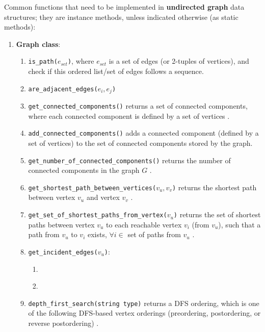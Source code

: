 Common functions that need to be implemented in {\bf undirected graph} data structures; they are instance methods, unless indicated otherwise (as static methods):
\begin{enumerate}
\item {\bf Graph class}: \vspace{-0.3cm}
	\begin{enumerate} \itemsep -2pt
	\item {\tt is\_path($e_{set}$)}, where $e_{set}$ is a set of edges (or 2-tuples of vertices), and check if this ordered list/set of edges follows a sequence.
	\item {\tt are\_adjacent\_edges($e_{i}, e_{j}$)} \cite[\S13.1.1, pp. 599]{Goodrich2011}
	\item {\tt get\_connected\_components()} returns a set of connected components, where each connected component is defined by a set of vertices \cite[\S52.44, pp. 850]{Goldman2008}.
	\item {\tt add\_connected\_components()} adds a connected component (defined by a set of vertices) to the set of connected components stored by the graph. %
	\item {\tt get\_number\_of\_connected\_components()} returns the number of connected components in the graph $G$ \cite[\S52.4, pp. 850]{Goldman2008}.
	\item {\tt get\_shortest\_path\_between\_vertices($v_{u}, v_{v}$)} returns the shortest path between vertex $v_{u}$ and vertex $v_{v}$ \cite[\S52.4, pp. 850]{Goldman2008}.
	\item {\tt get\_set\_of\_shortest\_paths\_from\_vertex($v_{u}$)} returns the set of shortest paths between vertex $v_{u}$ to each reachable vertex $v_{i}$ (from $v_{u}$), such that a path from $v_{u}$ to $v_{i}$ exists, $\forall i \in$ set of paths from $v_{u}$ \cite[\S52.4, pp. 850]{Goldman2008}.
	\item {\tt get\_incident\_edges($v_{u}$)}: \vspace{-0.2cm}
		\begin{enumerate} \itemsep -2pt
		\item \cite[\S13.1.1, pp. 599]{Goodrich2011}
		\item \cite[\S52.5, pp. 851]{Goldman2008}
		\end{enumerate}
	\item {\tt depth\_first\_search(string type)} returns a DFS ordering, which is one of the following DFS-based vertex orderings (preordering, postordering, or reverse postordering) \cite{WikipediaContributors2018a51}. \vspace{-0.2cm}

\end{enumerate}
\end{enumerate}
